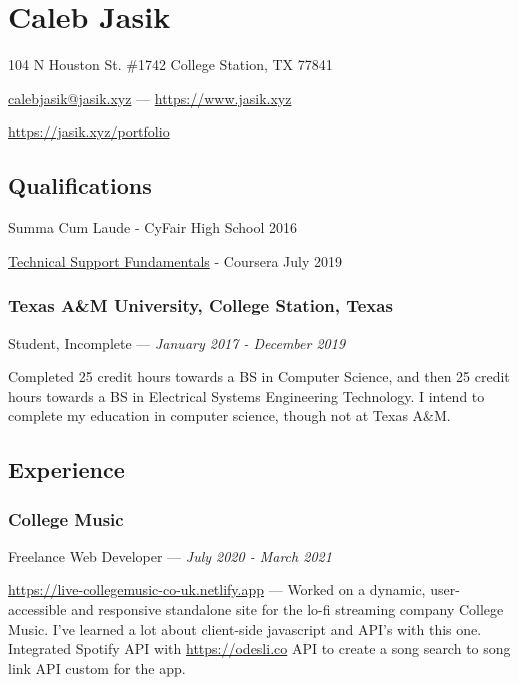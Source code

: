 \documentclass[letterpaper,10pt]{article}
\begin{document}
    \section{\Huge Caleb Jasik}\label{sec:hugecaleb-jasik}

    \hfill 104 N Houston St. \#1742 College Station, TX 77841

    \hfill \href{mailto:calebjasik@jasik.xyz}{calebjasik@jasik.xyz} ---
    \href{https://jasik.xyz}{https://www.jasik.xyz}
    
    \hfill \href{https://jasik.xyz/portfolio}{https://jasik.xyz/portfolio}

    \subsection{Qualifications}\label{subsec:qualifications}

    Summa Cum Laude - CyFair High School 2016

    \href{https://www.coursera.org/account/accomplishments/verify/GZEYJ5VA2YGH}{Technical Support Fundamentals} - Coursera July 2019

    \subsubsection{Texas A\&M University, College Station, Texas}
    \hfill Student, Incomplete --- \emph{January 2017 - December 2019}

    Completed 25 credit hours towards a BS in Computer Science, and then 25 credit hours towards a BS in Electrical Systems Engineering Technology. I intend to complete my education in computer science, though not at Texas A\&M.

    \subsection{Experience}\label{subsec:experience}

    \subsubsection{College Music}
    \hfill Freelance Web Developer --- \emph{July 2020 - March 2021}

    \href{https://live-collegemusic-co-uk.netlify.app}{https://live-collegemusic-co-uk.netlify.app} --- Worked on a dynamic, user-accessible and responsive standalone site for the lo-fi streaming company College Music. I've learned a lot about client-side javascript and API's with this one. Integrated Spotify API with \href{https://odesli.co}{https://odesli.co} API to create a song search to song link API custom for the app.
\end{document}
